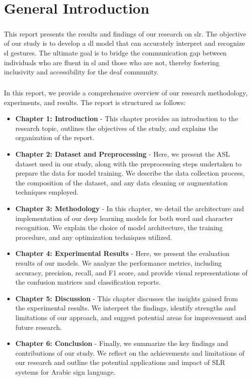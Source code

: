 \chapter*{General Introduction}
\paragraph{}
This report presents the results and findings of our research on \ac{slr}. The objective of our study is to develop a \ac{dl} model that can accurately interpret and recognize \ac{sl} gestures. The ultimate goal is to bridge the communication gap between individuals who are fluent in \ac{sl} and those who are not, thereby fostering inclusivity and accessibility for the deaf community.
\paragraph{}
In this report, we provide a comprehensive overview of our research methodology, experiments, and results. The report is structured as follows:
\begin{itemize}
	\item \textbf{Chapter 1: Introduction} - This chapter provides an introduction to the research topic, outlines the objectives of the study, and explains the organization of the report.
	
	\item \textbf{Chapter 2: Dataset and Preprocessing} - Here, we present the ASL dataset used in our study, along with the preprocessing steps undertaken to prepare the data for model training. We describe the data collection process, the composition of the dataset, and any data cleaning or augmentation techniques employed.
	
	\item \textbf{Chapter 3: Methodology} - In this chapter, we detail the architecture and implementation of our deep learning models for both word and character recognition. We explain the choice of model architecture, the training procedure, and any optimization techniques utilized.
	
	\item \textbf{Chapter 4: Experimental Results} - Here, we present the evaluation results of our models. We analyze the performance metrics, including accuracy, precision, recall, and F1 score, and provide visual representations of the confusion matrices and classification reports.
	
	\item \textbf{Chapter 5: Discussion} - This chapter discusses the insights gained from the experimental results. We interpret the findings, identify strengths and limitations of our approach, and suggest potential areas for improvement and future research.
	
	\item \textbf{Chapter 6: Conclusion} - Finally, we summarize the key findings and contributions of our study. We reflect on the achievements and limitations of our research and outline the potential applications and impact of SLR systems for Arabic sign language.
\end{itemize}
